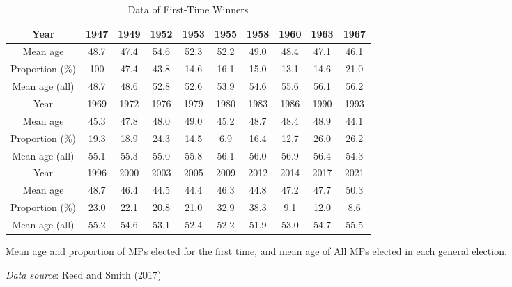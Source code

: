 
\begin{table}[ht]
\begin{threeparttable}
\begin{tabular}{c|ccccccccc}
\toprule
Year & 1947 & 1949 & 1952 & 1953 & 1955 & 1958 & 1960 & 1963 & 1967 \\
\midrule
Mean age & 48.7 & 47.4 & 54.6 & 52.3 & 52.2 & 49.0 & 48.4 & 47.1 & 46.1 \\
Proportion (\%) & 100 & 47.4 & 43.8 & 14.6 & 16.1 & 15.0 & 13.1 & 14.6 & 21.0 \\
Mean age (all) & 48.7 & 48.6 & 52.8 & 52.6 & 53.9 & 54.6 & 55.6 & 56.1 & 56.2 \\
\midrule 
Year & 1969 & 1972 & 1976 & 1979 & 1980 & 1983 & 1986 & 1990 & 1993 \\
\midrule 
Mean age & 45.3 & 47.8 & 48.0 & 49.0 & 45.2 & 48.7 & 48.4 & 48.9 & 44.1 \\
Proportion (\%) & 19.3 & 18.9 & 24.3 & 14.5 & 6.9 & 16.4 & 12.7 & 26.0 & 26.2 \\
Mean age (all) & 55.1 & 55.3 & 55.0 & 55.8 & 56.1 & 56.0 & 56.9 & 56.4 & 54.3 \\
\midrule 
Year & 1996 & 2000 & 2003 & 2005 & 2009 & 2012 & 2014 & 2017 & 2021 \\
\midrule 
Mean age & 48.7 & 46.4 & 44.5 & 44.4 & 46.3 & 44.8 & 47.2 & 47.7 & 50.3 \\
Proportion (\%) & 23.0 & 22.1 & 20.8 & 21.0 & 32.9 & 38.3 & 9.1 & 12.0 & 8.6 \\
Mean age (all) & 55.2 & 54.6 & 53.1 & 52.4 & 52.2 & 51.9 & 53.0 & 54.7 & 55.5 \\
\bottomrule
\end{tabular}
\begin{tablenotes}[flushleft]
  \scriptsize{
    \item Mean age and proportion of MPs elected for the first time, and mean age of All MPs elected in each general election. 
    \item \textit{Data source}: Reed and Smith (2017)
  }
\end{tablenotes}
\end{threeparttable}
\caption{Data of First-Time Winners}
\label{table:firstElection}
\end{table}